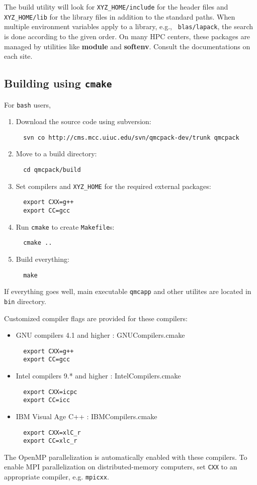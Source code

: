 The build utility \cmake will look for {\tt XYZ\_HOME/include} for the header
files and \texttt{XYZ\_HOME/lib} for the library files in addition to the 
standard paths.  When multiple environment variables apply to a library, e.g., {\tt
blas/lapack}, the search is done according to the given  order.  On many HPC
centers, these packages are managed by utilities like \textbf{module} and
\textbf{softenv}. Consult the documentations on each site. 

\subsection{Building using {\tt cmake}}\label{cmake.sec}

For {\tt bash} users,
\begin{enumerate}
\item Download the source code using subversion:
\begin{lstlisting}
  svn co http://cms.mcc.uiuc.edu/svn/qmcpack-dev/trunk qmcpack
\end{lstlisting}
\item Move to a build directory:
\begin{lstlisting}
  cd qmcpack/build
\end{lstlisting}
\item Set compilers and \texttt{XYZ\_HOME} for the required external packages:
\begin{lstlisting}
  export CXX=g++
  export CC=gcc
\end{lstlisting}
\item Run {\tt cmake} to create \nolinkurl{Makefile}s:
\begin{lstlisting}
  cmake ..
\end{lstlisting}
\item Build everything:
\begin{lstlisting}
  make
\end{lstlisting}
\end{enumerate}

If everything goes well, main executable {\tt qmcapp} and other utilites are
located in {\tt bin} directory. 

Customized compiler flags are provided for these compilers:
\begin{itemize}
\item{}GNU compilers 4.1 and higher : GNUCompilers.cmake 
\begin{lstlisting}
  export CXX=g++
  export CC=gcc
\end{lstlisting}
\item{}Intel compilers 9.* and higher : IntelCompilers.cmake 
\begin{lstlisting}
  export CXX=icpc
  export CC=icc
\end{lstlisting}
\item{}IBM Visual Age C++ : IBMCompilers.cmake
\begin{lstlisting}
  export CXX=xlC_r
  export CC=xlc_r
\end{lstlisting}
\end{itemize}
The OpenMP parallelization is automatically enabled with these compilers. To
enable MPI parallelization on distributed-memory computers, set {\tt CXX} to an
appropriate compiler, e.g. {\tt mpicxx}.
  
